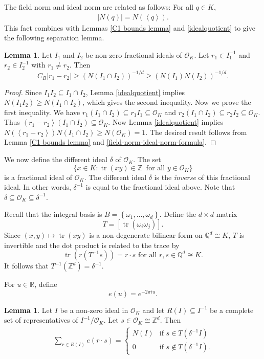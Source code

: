 \documentclass{amsart}
\numberwithin{equation}{section}
\theoremstyle{definition}
\newtheorem{lemma}[theorem]{Lemma}
\theoremstyle{definition}
\def\RR{\mathbb{R}}
\def\QQ{\mathbb{Q}}
\def\ZZ{\mathbb{Z}}
\newcommand{\cbr}[1]{ \left\{ {#1} \right\} }
\newcommand{\abr}[1]{\left\langle {#1} \right\rangle}
\newcommand{\OK}{\mathcal{O}_K}
\newcommand{\isom}{\cong}
\DeclareMathOperator{\tr}{tr}
\begin{document}
The field norm and ideal norm are related as follows:
For all $q \in K$, 
\begin{align}\label{field-norm-ideal-norm-formula}
|N(q)| = N(\abr{q}).  
\end{align}
%
This fact combines with Lemmas \ref{C1 bounds lemma} and \ref{idealquotient} to give the following separation lemma. 

\begin{lemma}\label{separation lemma}
Let $I_1$ and $I_2$ be non-zero fractional ideals of $\OK$. Let $r_1 \in I_1^{-1}$ and $r_2 \in I_2^{-1}$ with $r_1 \neq r_2$. Then 
$$
C_B|r_1 - r_2| 
\geq (N(I_1 \cap I_2))^{-1/d}
\geq (N(I_1) N(I_2))^{-1/d}. 
$$
\end{lemma}

\begin{proof}
Since $I_1 I_2 \subseteq I_1 \cap I_2$, Lemma \ref{idealquotient} implies $N(I_1 I_2) \geq N(I_1 \cap I_2)$, which gives the second inequality. Now we prove the first inequality.
We have $r_1 (I_1 \cap I_2) \subseteq r_1 I_1 \subseteq \OK$ 
and 
$r_2 (I_1 \cap I_2) \subseteq r_2 I_2 \subseteq \OK$. 
Thus $\abr{r_1 - r_2}(I_1 \cap I_2) \subseteq \OK$. Now Lemma \ref{idealquotient} implies 
$N(\abr{r_1 - r_2})N(I_1 \cap I_2) \geq N(\OK) = 1$. 
The desired result follows from Lemma \ref{C1 bounds lemma} and \eqref{field-norm-ideal-norm-formula}.
\end{proof}


We now define the different ideal $\delta$ of $\OK$.  
The set 
$$
\{ x \in K : \tr(xy) \in \ZZ \ \text{ for all } y \in \OK \}
$$ 
is a fractional ideal of $\OK$. 
The different ideal $\delta$ is the \textit{inverse} of this fractional ideal. In other words, $\delta^{-1}$ is equal to the fractional ideal above. Note that $\delta \subseteq \OK \subseteq \delta^{-1}$. 





Recall that the integral basis is $B = \cbr{\omega_1,\ldots,\omega_d}$. %
Define the $d \times d$ matrix 
$$T =
[\tr(\omega_i \omega_j)].$$ 
Since $(x,y) \mapsto \tr(xy)$ is a non-degenerate bilinear form on $\QQ^d \isom K$, $T$ is invertible and 
the dot product is related to the trace by 
$$\tr(r(T^{-1}s)) = r \cdot s \text{ for all $r,s \in \QQ^d \isom K$}.$$
It follows that $T^{-1}(\ZZ^d) = \delta^{-1}$.

For $u \in \RR$, define 
$$
e(u)=e^{-2\pi i u}. 
$$

\begin{lemma}\label{NEWGeomSeriesProp}
Let $I$ be a non-zero ideal in $\OK$ and let $R(I) \subseteq I^{-1}$ be a complete set of representatives of $ I^{-1} / \OK$. Let $s \in \OK \isom \ZZ^d$. Then 
\begin{align*}
\sum_{r \in R(I)} e(r \cdot s)
=
\left\{
\begin{array}{ll}
N(I) & \text{if $s \in T(\delta^{-1} I) $}  \\
0       & \text{if $s \notin T(\delta^{-1} I) $.} 
\end{array}
\right.
\end{align*}
\end{lemma}
\end{document}

